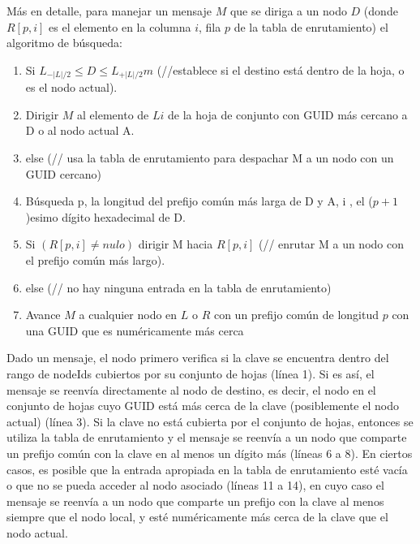  M\'as en detalle, para manejar un mensaje $M$ que se diriga  a un nodo $D$ (donde $R[p ,i]$ es el elemento en la columna $i$,   fila $p$ de la tabla de enrutamiento) el algoritmo de b\'usqueda:

 
 
 \begin{enumerate}
 	\item  Si $L_{-{|L|/2}}  \le D \le L_{+{|L|/2}}m$  (//establece si  el destino está dentro de la hoja,  o  es el nodo  actual).
 	\item Dirigir  $M$  al elemento de $Li$ de la hoja de conjunto con GUID más     cercano a D o  al nodo actual A.    
	\item  else  (// usa  la tabla de enrutamiento para despachar M a un nodo con un GUID cercano)
 	\item Búsqueda p, la longitud del prefijo común más larga de D y A, i , el ($p+1$)esimo  dígito hexadecimal de D.
	\item  Si $(R[p, i] \neq nulo)$ dirigir M hacia $R[p,i]$ (// enrutar M a un nodo con el  prefijo común  más largo).
	\item else (// no hay ninguna entrada en la tabla de enrutamiento)
 	\item Avance $M$ a cualquier nodo en $L$ o $R$ con un prefijo común de longitud $p$  con  una GUID que es numéricamente más cerca 
  \end{enumerate}
 
 
 Dado un mensaje, el nodo primero verifica si la clave se encuentra dentro del rango de nodeIds cubiertos por su conjunto de hojas (línea 1). Si es así, el mensaje se reenvía directamente al  nodo de destino, es decir, el nodo en el conjunto de hojas cuyo GUID está más cerca de la clave (posiblemente el nodo actual) (línea 3).
 Si la clave no está cubierta por el conjunto de hojas, entonces se utiliza la tabla de enrutamiento y el mensaje se reenvía a un nodo que comparte un prefijo común con la clave en al menos un dígito más (líneas 6 a 8). En ciertos casos, es posible que la entrada apropiada en la tabla de enrutamiento esté vacía o que no se pueda acceder al nodo asociado (líneas 11 a 14), en cuyo caso el mensaje se reenvía a un nodo que comparte un prefijo con la clave al menos siempre que el nodo local, y esté numéricamente más cerca de la clave que el nodo actual.
 
